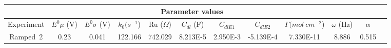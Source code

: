 \documentclass[preview]{standalone}
\begin{document}
\begin{center}
\begin{tabular}{|c|c|c|c|c|c|c|c|c|c|c|c|}
\hline
\multicolumn{11}{|c|}{Parameter values}\\ 
\hline
Experiment & $E^0 \mu$ (V) & $E^0 \sigma$ (V) & $k_0 (s^{-1}$) & Ru ($\Omega$) & $C_{dl}$ (F) & $C_{dlE1}$ & $C_{dlE2}$ & $\Gamma (mol\:cm^{-2}$) & $\omega$ (Hz) & $\alpha$\\
\hline
Ramped\ 2 & 0.23 & 0.041 & 122.166 & 742.029 & 8.213E-5 & 2.950E-3 & -5.139E-4 & 7.330E-11 & 8.886 & 0.515\\
\hline
\end{tabular}
\end{center}
\end{document}
